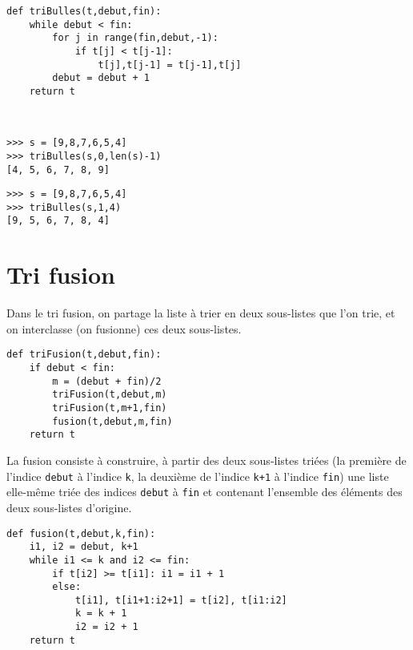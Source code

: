 {}
\begin{lstlisting}[caption={\bf Tri bulles},label=cl:triBulles]
def triBulles(t,debut,fin):
    while debut < fin:
        for j in range(fin,debut,-1):
            if t[j] < t[j-1]: 
                t[j],t[j-1] = t[j-1],t[j]
        debut = debut + 1
    return t
\end{lstlisting}

\mbox{}\ \ \begin{py}{8cm}
\begin{verbatim}
>>> s = [9,8,7,6,5,4]
>>> triBulles(s,0,len(s)-1)
[4, 5, 6, 7, 8, 9]
\end{verbatim}
\end{py}
\hfill
\begin{py}{5cm}
\begin{verbatim}
>>> s = [9,8,7,6,5,4]
>>> triBulles(s,1,4)
[9, 5, 6, 7, 8, 4]
\end{verbatim}
\end{py}

\section*{Tri fusion}
Dans le tri fusion, on partage la liste à trier en deux sous-listes que l'on trie, et on
interclasse (on fusionne) ces deux sous-listes.

\newpage
{}
\begin{lstlisting}[caption={\bf Tri fusion},label=cl:triFusion]
def triFusion(t,debut,fin):
    if debut < fin:
        m = (debut + fin)/2
        triFusion(t,debut,m)
        triFusion(t,m+1,fin)
        fusion(t,debut,m,fin)
    return t
\end{lstlisting}

La fusion consiste à construire, à partir des deux sous-listes triées (la première de
l'indice {\tt debut} à l'indice {\tt k}, la deuxième de l'indice {\tt k+1} à l'indice 
{\tt fin}) une liste elle-même triée des indices {\tt debut} à {\tt fin}
et contenant l'ensemble des éléments des deux sous-listes d'origine.

\begin{lstlisting}[title={\bf Fusion}]
def fusion(t,debut,k,fin):
    i1, i2 = debut, k+1
    while i1 <= k and i2 <= fin:
        if t[i2] >= t[i1]: i1 = i1 + 1
        else:
            t[i1], t[i1+1:i2+1] = t[i2], t[i1:i2]
            k = k + 1
            i2 = i2 + 1
    return t
\end{lstlisting}

